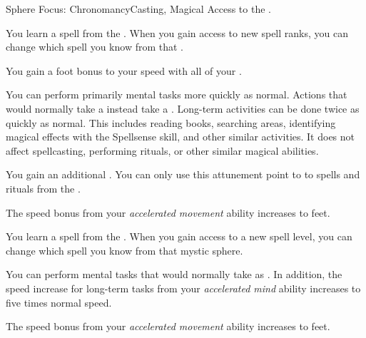     \begin{feat}{Sphere Focus: Chronomancy}{Casting, Magical}
        \featpre Access to the  .

         You learn a spell from the  .
        When you gain access to new spell ranks, you can change which spell you know from that .

         You gain a  foot bonus to your speed with all of your .

         You can perform primarily mental tasks more quickly as normal.
        Actions that would normally take a  instead take a .
        Long-term activities can be done twice as quickly as normal.
        This includes reading books, searching areas, identifying magical effects with the Spellsense skill, and other similar activities.
        It does not affect spellcasting, performing rituals, or other similar magical abilities.

         You gain an additional .
        You can only use this attunement point to  to spells and rituals from the  .

         The speed bonus from your \textit{accelerated movement} ability increases to  feet.

         You learn a spell from the  .
        When you gain access to a new spell level, you can change which spell you know from that mystic sphere.

         You can perform  mental tasks that would normally take  as .
        In addition, the speed increase for long-term tasks from your \textit{accelerated mind} ability increases to five times normal speed.

         The speed bonus from your \textit{accelerated movement} ability increases to  feet.
    \end{feat}

